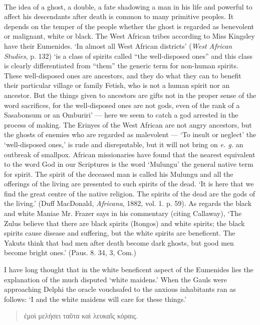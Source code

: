 \documentclass[a4paper, 11pt, oneside, polutonikogreek, english]{article}
\begin{document}
\paragraph{}
The idea of a ghost, a double, a fate shadowing a man in his life and powerful to affect his descendants after death is common to many primitive peoples. It depends on the temper of the people whether the ghost is regarded as benevolent or malignant, white or black. The West African tribes according to Miss Kingsley have their Eumenides. `In almost all West African districts' (\emph{West African Studies}, p. 132) `is a class of spirits called ``the well-disposed ones'' and this class is clearly differentiated from ``them'' the generic term for non-human spirits. These well-disposed ones are ancestors, and they do what they can to benefit their particular village or family Fetish, who is not a human spirit nor an ancestor. But the things given to ancestors are gifts not in the proper sense of the word sacrifices, for the well-disposed ones are not gods, even of the rank of a Sasabonsum or an Omburiri' --- here we seem to catch a god arrested in the process of making. The Erinyes of the West African are not angry ancestors, but the ghosts of enemies who are regarded as malevolent --- `To insult or neglect' the `well-disposed ones,' is rude and disreputable, but it will not bring on \emph{e. g.} an outbreak of smallpox. African missionaries have found that the nearest equivalent to the word God in our Scriptures is the word `Mulungu' the general native term for spirit. The spirit of the deceased man is called his Mulungu and all the offerings of the living are presented to such spirits of the dead. `It is here that we find the great centre of the native religion. The spirits of the dead are the gods of the living.' (Duff MacDonald, \emph{Africana}, 1882, vol. 1. p. 59). As regards the black and white Maniae Mr. Frazer says in his commentary (citing Callaway), `The Zulus believe that there are black spirits (Itongos) and white spirits; the black spirits cause disease and suffering, but the white spirits are beneficent. The Yakuts think that bad men after death become dark ghosts, but good men become bright ones.' (Paus. 8. 34, 3, Com.)

I have long thought that in the white beneficent aspect of the Eumenides lies the explanation of the much disputed `white maidens.' When the Gauls were approaching Delphi the oracle vouchsafed to the anxious inhabitants ran as follows: `I and the white maidens will care for these things.'
\begin{quotation}
ἐμοὶ μελήσει ταῦτα καὶ λευκαῖς κόραις.
\end{quotation}
\end{document}
